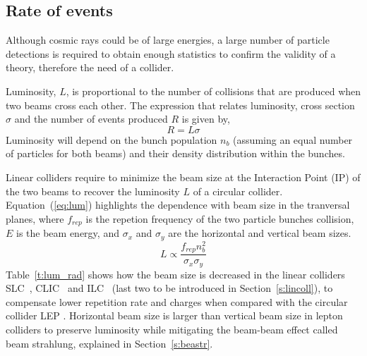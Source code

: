 \subsection{Rate of events}
Although cosmic rays could be of large energies, a large number of particle detections is required to obtain enough statistics to confirm the validity of a theory,  therefore the need of a collider.\par
Luminosity, $L$, is proportional to the number of collisions that are produced when two beams cross each other. The expression that relates luminosity, cross section $\sigma$ and the number of events produced $R$ is given by,
\begin{equation}
 R=L\sigma
\end{equation}
Luminosity will depend on the bunch population 	$n_b$ (assuming an equal number of particles for both beams) and their density distribution within the bunches.\par 
Linear colliders require to minimize the beam size at the Interaction Point (IP) of the two beams to recover the luminosity $L$ of a circular collider. Equation~(\ref{eq:lum}) highlights the dependence with beam size in the tranversal planes, where $f_{rep}$ is the repetion frequency of the two particle bunches collision, $E$ is the beam energy, and $\sigma_x$ and $\sigma_y$ are the horizontal and vertical beam sizes.
\begin{equation}
 L \propto \frac{f_{rep}n_b^2}{\sigma_x\sigma_y}\label{eq:lum}%
\end{equation}
Table~\ref{t:lum_rad} shows how the beam size is decreased in the linear colliders SLC~\cite{PhysRevD.54.1}, CLIC~\cite{CLICdes} and ILC~\cite{ILCdes} (last two to be introduced in Section~\ref{s:lincoll}), to compensate lower repetition rate and charges when compared with the circular collider LEP \cite{Colliderparam}. Horizontal beam size is larger than vertical beam size in lepton colliders to preserve luminosity while mitigating the beam-beam effect called beam strahlung, explained in Section~\ref{s:beastr}.\par
